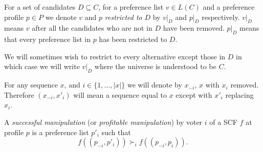 	\begin{definition}
		\label{preference-restriction-definition}
		For a set of candidates $D \subseteq C$, for a preference list $v \in L(C)$ and a preference profile $p \in P$ we denote $v$ and $p$ \emph{restricted to} $D$ by $v|_D$ and $p|_D$ respectively. $v|_D$ means $v$ after all the candidates who are not in $D$ have been removed. $p|_D$ means that every preference list in $p$ has been restricted to $D$.

		We will sometimes wish to restrict to every alternative except those in $D$ in which case we will write $v|_{\overline{D}}$ where the universe is understood to be $C$.
	\end{definition}

	\begin{definition}
		For any sequence $x$, and $i \in \{1, \ldots, |x|\}$ we will denote by $x_{-i}$, $x$ with $x_i$ removed. Therefore $(x_{-i}, x'_i)$ will mean a sequence equal to $x$ except with $x'_i$ replacing $x_i$.
	\end{definition}

	\begin{definition}
		\label{manipulation-definition}
		A \emph{successful manipulation} (or \emph{profitable manipulation}) by voter $i$ of a SCF $f$ at profile $p$ is a preference list $p'_i$ such that
		\[
			f((p_{-i}, p'_i)) \succ_i f((p_{-i}, p_i)).
		\]
	\end{definition}
